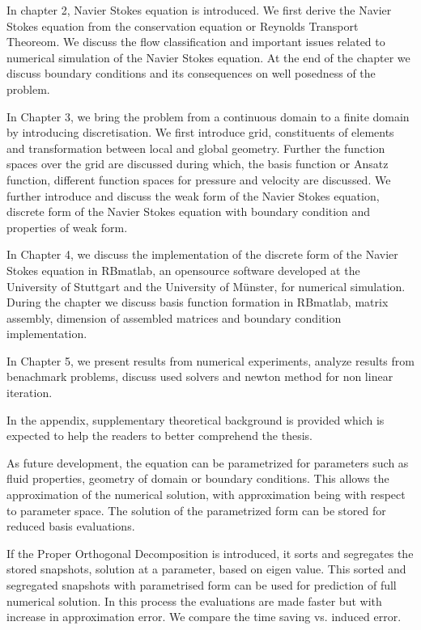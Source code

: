 \documentclass[a4paper,12pt]{book}
\begin{document}
In chapter 2, Navier Stokes equation is introduced. We first derive the Navier Stokes equation from the conservation equation or Reynolds Transport Theoreom. We discuss the flow classification and important issues related to numerical simulation of the Navier Stokes equation. At the end of the chapter we discuss boundary conditions and its consequences on well posedness of the problem.

In Chapter 3, we bring the problem from a continuous domain to a finite domain by introducing discretisation. We first introduce grid, constituents of elements and transformation between local and global geometry. Further the function spaces over the grid are discussed during which, the basis function or Ansatz function, different function spaces for pressure and velocity are discussed. We further introduce and discuss the weak form of the Navier Stokes equation, discrete form of the Navier Stokes equation with boundary condition and properties of weak form.

In Chapter 4, we discuss the implementation of the discrete form of the Navier Stokes equation in RBmatlab, an opensource software developed at the University of Stuttgart and the University of M\"unster, for numerical simulation. During the chapter we discuss basis function formation in RBmatlab, matrix assembly, dimension of assembled matrices and boundary condition implementation.

In Chapter 5, we present results from numerical experiments, analyze results from benachmark problems, discuss used solvers and newton method for non linear iteration.

In the appendix, supplementary theoretical background is provided which is expected to help the readers to better comprehend the thesis.

As future development, the equation can be parametrized for parameters such as fluid properties, geometry of domain or boundary conditions. This allows the approximation of the numerical solution, with approximation being with respect to parameter space. The solution of the parametrized form can be stored for reduced basis evaluations.

If the Proper Orthogonal Decomposition is introduced, it sorts and segregates the stored snapshots, solution at a parameter, based on eigen value. This sorted and segregated snapshots with parametrised form can be used for prediction of full numerical solution. In this process the evaluations are made faster but with increase in approximation error. We compare the time saving vs. induced error.
\end{document}
